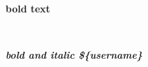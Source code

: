 \documentclass[12pt, a4paper]{article}
\begin{document}
\noindent \textbf{bold text} \\

\vspace{10mm}

\lipsum[10] \\

\begin{center}
\textbf{\textit{bold and italic \$\{username\}}} \\
\end{center}

\lipsum[10] \\
\end{document}
